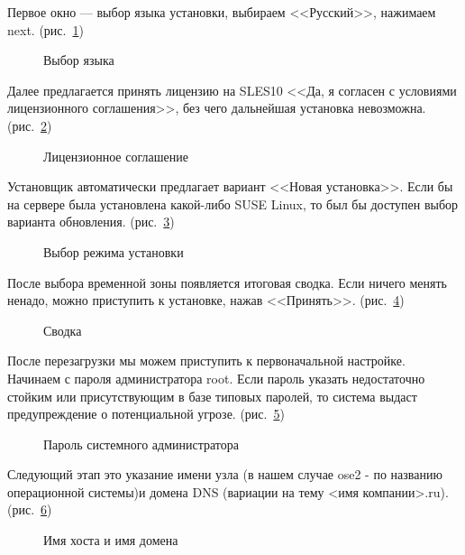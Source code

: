 Первое окно — выбор языка установки, выбираем <<Русский>>, нажимаем next. (рис.~\ref{fig2})
\begin{figure}[H]
\caption{Выбор языка}
\label{fig2}
\end{figure}
\clearpage

Далее предлагается принять лицензию на SLES10 <<Да, я согласен с условиями лицензионного соглашения>>, без чего дальнейшая установка невозможна. (рис.~\ref{fig3})
\begin{figure}[H]
\caption{Лицензионное соглашение}
\label{fig3}
\end{figure}
\clearpage

Установщик автоматически предлагает вариант <<Новая установка>>. Если бы на сервере была установлена какой-либо SUSE Linux, то был бы доступен выбор варианта обновления. (рис.~\ref{fig4})
\begin{figure}[H]
\caption{Выбор режима установки}
\label{fig4}
\end{figure}
\clearpage

После выбора временной зоны появляется итоговая сводка. Если ничего менять ненадо, можно приступить к установке, нажав <<Принять>>. (рис.~\ref{fig5})
\begin{figure}[H]
\caption{Сводка}
\label{fig5}
\end{figure}
\clearpage

После перезагрузки мы можем приступить к первоначальной настройке.\\
Начинаем с пароля администратора root. Если пароль указать недостаточно стойким или присутствующим в базе типовых паролей, то система выдаст предупреждение о потенциальной угрозе. (рис.~\ref{fig6})
\begin{figure}[H]
\caption{Пароль системного администратора}
\label{fig6}
\end{figure}
\clearpage

Следующий этап это указание имени узла (в нашем случае ose2 - по названию операционной системы)и домена DNS (вариации на тему <имя компании>.ru). (рис.~\ref{fig7})
\begin{figure}[H]
\caption{Имя хоста и имя домена}
\label{fig7}
\end{figure}
\clearpage

